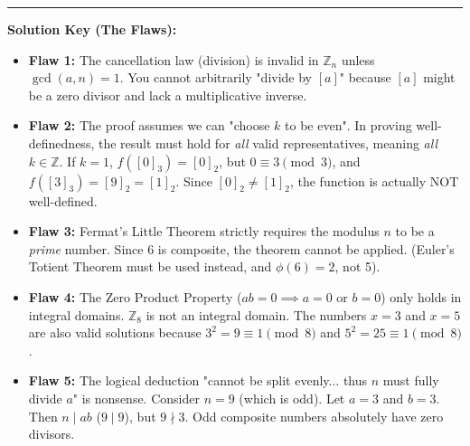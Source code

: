 \documentclass[11pt, a4paper]{article}
\theoremstyle{definition}
\theoremstyle{remark}
\newcommand{\Z}{\mathbb{Z}}
\begin{document}
\vspace{1em}
\hrule
\vspace{1em}
\textbf{Solution Key (The Flaws):}
\begin{itemize}
    \item \textbf{Flaw 1:} The cancellation law (division) is invalid in $\Z_n$ unless $\gcd(a, n) = 1$. You cannot arbitrarily "divide by $[a]$" because $[a]$ might be a zero divisor and lack a multiplicative inverse.
    \item \textbf{Flaw 2:} The proof assumes we can "choose $k$ to be even". In proving well-definedness, the result must hold for \textit{all} valid representatives, meaning \textit{all} $k \in \Z$. If $k=1$, $f([0]_3) = [0]_2$, but $0 \equiv 3 \pmod 3$, and $f([3]_3) = [9]_2 = [1]_2$. Since $[0]_2 \neq [1]_2$, the function is actually NOT well-defined.
    \item \textbf{Flaw 3:} Fermat's Little Theorem strictly requires the modulus $n$ to be a \textit{prime} number. Since $6$ is composite, the theorem cannot be applied. (Euler's Totient Theorem must be used instead, and $\phi(6) = 2$, not 5).
    \item \textbf{Flaw 4:} The Zero Product Property ($ab=0 \implies a=0$ or $b=0$) only holds in integral domains. $\Z_8$ is not an integral domain. The numbers $x=3$ and $x=5$ are also valid solutions because $3^2 = 9 \equiv 1 \pmod 8$ and $5^2 = 25 \equiv 1 \pmod 8$.
    \item \textbf{Flaw 5:} The logical deduction "cannot be split evenly... thus $n$ must fully divide $a$" is nonsense. Consider $n=9$ (which is odd). Let $a=3$ and $b=3$. Then $n \mid ab$ ($9 \mid 9$), but $9 \nmid 3$. Odd composite numbers absolutely have zero divisors.
\end{itemize}
\end{document}
